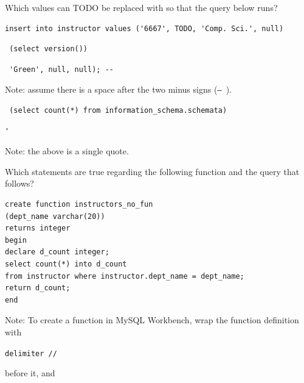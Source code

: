 \documentclass[12pt, addpoints, answers]{exam}
\begin{document}
\begin{questions}
\begin{minipage}{\linewidth}
\question[6]
Which values can TODO be replaced with so that the query below runs?\par\vspace{0.5em}
\begin{verbatim}
insert into instructor values ('6667', TODO, 'Comp. Sci.', null)
\end{verbatim}
\par\vspace{0.5em}
\begin{checkboxes}
    \CorrectChoice \begin{verbatim} (select version()) \end{verbatim}
    \CorrectChoice 
    \begin{verbatim} 'Green', null, null); -- \end{verbatim}
    \vspace{-0.5em}
    {\footnotesize Note: assume there is a space after the two minus signs (\texttt{-- }).}
    \CorrectChoice \begin{verbatim} (select count(*) from information_schema.schemata) \end{verbatim}
    \choice \begin{verbatim}'\end{verbatim}
    \vspace{-0.5em}
    {\footnotesize Note: the above is a single quote.}
\end{checkboxes}
\end{minipage}\vspace{1em}

\begin{minipage}{\linewidth}
\question[4]
Which statements are true regarding the following function and the query that follows?\par\vspace{0.5em}

\begin{verbatim}
create function instructors_no_fun
(dept_name varchar(20))
returns integer
begin
declare d_count integer;
select count(*) into d_count 
from instructor where instructor.dept_name = dept_name;
return d_count;
end
\end{verbatim}

{\footnotesize Note: To create a function in MySQL Workbench, wrap the function definition with

\texttt{delimiter //} 

before it, and 

}
\end{minipage}
\end{questions}
\end{document}
